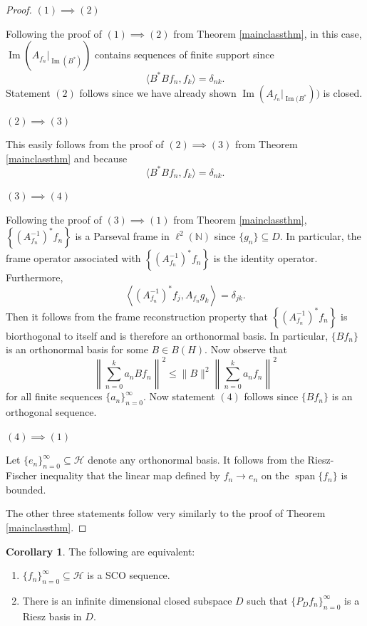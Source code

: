 \documentclass[11pt]{amsart}
\theoremstyle{definition}
\newtheorem{cor}{Corollary}[section]
\numberwithin{equation}{section}
\newcommand{\Hcal}{\mathcal{H}} %
\begin{document}
\begin{proof}
$(1)\implies (2)$

Following the proof of $(1)\implies (2)$ from Theorem \ref{mainclassthm}, in this case, $\operatorname{Im}(A_{f_n}|_{\operatorname{Im}(B^{*})})$ contains sequences of finite support since 
$$\langle B^{*}Bf_n,f_k\rangle=\delta_{nk}.$$
Statement $(2)$ follows since we have already shown $\operatorname{Im}(A_{f_n}|_{\operatorname{Im}(B^{*}}))$ is closed.

$(2)\implies (3)$

This easily follows from the proof of $(2)\implies (3)$ from Theorem \ref{mainclassthm} and because $$\langle B^{*}Bf_n,f_k\rangle=\delta_{nk}.$$

$(3)\implies (4)$

Following the proof of $(3)\implies (1)$ from Theorem \ref{mainclassthm},
$\left\{(A^{-1}_{f_n})^{*}f_n \right\}$ is a Parseval frame in $\ell^{2}(\mathbb{N})$ since $\{g_n\}\subseteq D$. In particular, the frame operator associated with $\left\{(A^{-1}_{f_n})^{*}f_n \right\}$  is the identity operator.
Furthermore, 
$$\left\langle (A^{-1}_{f_n})^{*}f_j,A_{f_n}g_k\right\rangle= \delta_{jk}.$$
Then it follows from the frame reconstruction property that $\left\{(A^{-1}_{f_n})^{*}f_n \right\}$ is biorthogonal to itself and is therefore an orthonormal basis. In particular, $\{Bf_n\}$ is an orthonormal basis for some $B\in B(H)$. Now observe that
$$\left\|\sum_{n=0}^{k}a_n Bf_n \right \|^2\leq \|B\|^2 \left\|\sum_{n=0}^{k}a_n f_n \right \|^2$$ for all finite sequences $\{a_n\}_{n=0}^{\infty}.$ Now statement $(4)$ follows since $\{Bf_n\}$ is an orthogonal sequence.

$(4)\implies (1)$

Let $\{e_n\}_{n=0}^{\infty}\subseteq \Hcal$ denote any orthonormal basis. It follows from the Riesz-Fischer inequality that the linear map defined by $f_n \to e_n$ on the $\operatorname{span}\{f_n\}$ is bounded.

The other three statements follow very similarly to the proof of Theorem \ref{mainclassthm}.
\end{proof}

\begin{cor}
The following are equivalent:
\begin{enumerate}
    \item $\{f_n\}_{n=0}^{\infty}\subseteq \Hcal$ is a SCO sequence.
    \item There is an infinite dimensional closed subspace $D$ such that \newline $\{P_{D}f_n\}_{n=0}^{\infty}$ is a Riesz basis in $D$.
\end{enumerate}
\end{cor}
\end{document}
